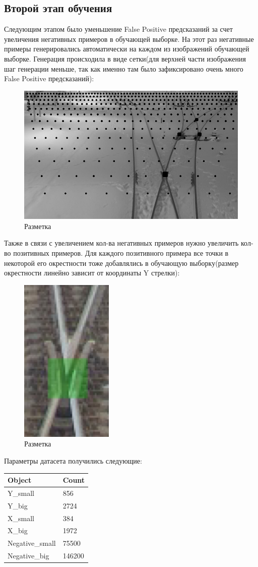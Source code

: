 \subsection{Второй этап обучения}
Следующим этапом было уменьшение False Positive предсказаний за счет увеличения негативных примеров в обучающей выборке. На этот раз негативные примеры генерировались автоматически на каждом из изображений обучающей выборке. Генерация происходила в виде сетки(для верхней части изображения шаг генерации меньше, так как именно там было зафиксировано очень много False Positive предсказаний):
\begin{figure}[h!]
	\centering
	\includegraphics[width=0.7\linewidth]{pictures/grid_negative.png}
	\caption{Разметка}
	\label{fig:screenshot32}
\end{figure}
\newline
Также в связи с увеличением кол-ва негативных примеров нужно увеличить кол-во позитивных примеров. Для каждого позитивного примера все точки в некоторой его окрестности тоже добавлялись в обучающую выборку(размер окрестности линейно зависит от координаты Y стрелки):
\begin{figure}[!h]
	\centering
	\includegraphics[width=0.1\linewidth]{pictures/screenshot2323}
	\caption{Разметка}
	\label{fig:screenshot2323}
\end{figure}
\newpage
Параметры датасета получились следующие:
\begin{table}[!h]
	\begin{tabular}{|l|l|}
		\hline
		\textbf{Object} & \textbf{Count} \\ \hline
		Y\_small        & 856            \\ \hline
		Y\_big          & 2724           \\ \hline
		X\_small        & 384            \\ \hline
		X\_big          & 1972           \\ \hline
		Negative\_small & 75500          \\ \hline
		Negative\_big   & 146200         \\ \hline
	\end{tabular}
\end{table}

